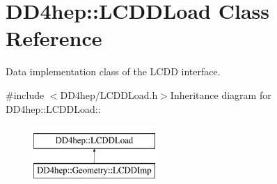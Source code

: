 \hypertarget{class_d_d4hep_1_1_l_c_d_d_load}{
\section{DD4hep::LCDDLoad Class Reference}
\label{class_d_d4hep_1_1_l_c_d_d_load}
}


Data implementation class of the LCDD interface.  


{\ttfamily \#include $<$DD4hep/LCDDLoad.h$>$}Inheritance diagram for DD4hep::LCDDLoad::\begin{figure}[H]
\begin{center}
\leavevmode
\includegraphics[height=2cm]{class_d_d4hep_1_1_l_c_d_d_load}
\end{center}
\end{figure}

